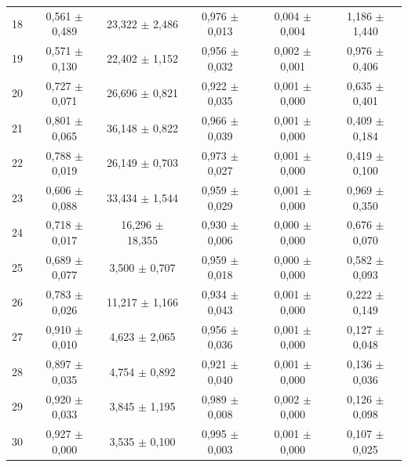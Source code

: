 \begin{tabular}{l c c c c c}
18 & 0,561 $\pm$ 0,489 & 23,322 $\pm$ 2,486 & 0,976 $\pm$ 0,013 & 0,004 $\pm$ 0,004 & 1,186 $\pm$ 1,440 \\
19 & 0,571 $\pm$ 0,130 & 22,402 $\pm$ 1,152 & 0,956 $\pm$ 0,032 & 0,002 $\pm$ 0,001 & 0,976 $\pm$ 0,406 \\
20 & 0,727 $\pm$ 0,071 & 26,696 $\pm$ 0,821 & 0,922 $\pm$ 0,035 & 0,001 $\pm$ 0,000 & 0,635 $\pm$ 0,401 \\
21 & 0,801 $\pm$ 0,065 & 36,148 $\pm$ 0,822 & 0,966 $\pm$ 0,039 & 0,001 $\pm$ 0,000 & 0,409 $\pm$ 0,184 \\
22 & 0,788 $\pm$ 0,019 & 26,149 $\pm$ 0,703 & 0,973 $\pm$ 0,027 & 0,001 $\pm$ 0,000 & 0,419 $\pm$ 0,100 \\
23 & 0,606 $\pm$ 0,088 & 33,434 $\pm$ 1,544 & 0,959 $\pm$ 0,029 & 0,001 $\pm$ 0,000 & 0,969 $\pm$ 0,350 \\
24 & 0,718 $\pm$ 0,017 & 16,296 $\pm$ 18,355 & 0,930 $\pm$ 0,006 & 0,000 $\pm$ 0,000 & 0,676 $\pm$ 0,070 \\
25 & 0,689 $\pm$ 0,077 & 3,500 $\pm$ 0,707 & 0,959 $\pm$ 0,018 & 0,000 $\pm$ 0,000 & 0,582 $\pm$ 0,093 \\
26 & 0,783 $\pm$ 0,026 & 11,217 $\pm$ 1,166 & 0,934 $\pm$ 0,043 & 0,001 $\pm$ 0,000 & 0,222 $\pm$ 0,149 \\
27 & 0,910 $\pm$ 0,010 & 4,623 $\pm$ 2,065 & 0,956 $\pm$ 0,036 & 0,001 $\pm$ 0,000 & 0,127 $\pm$ 0,048 \\
28 & 0,897 $\pm$ 0,035 & 4,754 $\pm$ 0,892 & 0,921 $\pm$ 0,040 & 0,001 $\pm$ 0,000 & 0,136 $\pm$ 0,036 \\
29 & 0,920 $\pm$ 0,033 & 3,845 $\pm$ 1,195 & 0,989 $\pm$ 0,008 & 0,002 $\pm$ 0,000 & 0,126 $\pm$ 0,098 \\
30 & 0,927 $\pm$ 0,000 & 3,535 $\pm$ 0,100 & 0,995 $\pm$ 0,003 & 0,001 $\pm$ 0,000 & 0,107 $\pm$ 0,025 \\
\hline 
 \end{tabular}
